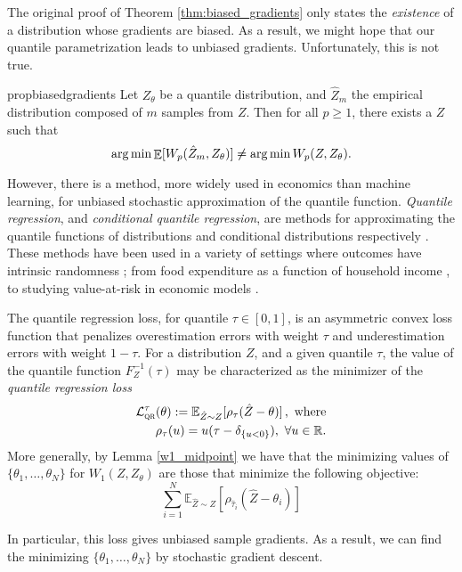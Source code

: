\documentclass[letterpaper]{article}
\newcommand{\cL}{\mathcal{L}}
\DeclareMathOperator*{\expect}{{\huge \mathbb{E}}}
\DeclareMathOperator*{\argmin}{arg\,min}
\begin{document}
The original proof of Theorem \ref{thm:biased_gradients} only states the \emph{existence} of a distribution whose gradients are biased. As a result, we might hope that our quantile parametrization leads to unbiased gradients. Unfortunately, this is not true.
\begin{restatable}{prop}{biasedgradients}\label{prop:biased_transpose_gradients}
Let $Z_\theta$ be a quantile distribution, and $\hat{Z}_m$ the empirical distribution composed of $m$ samples from $Z$. Then for all $p \ge 1$, there exists a $Z$ such that
\begin{equation*}
    \argmin \expect [ W_p(\hat{Z}_m, Z_\theta) ] \neq \argmin W_p(Z, Z_\theta) .
\end{equation*}
\end{restatable}

However, there is a method, more widely used in economics than machine learning, for unbiased stochastic approximation of the quantile function. \textit{Quantile regression}, and \textit{conditional quantile regression}, are methods for approximating the quantile functions of distributions and conditional distributions respectively \cite{qrbook}. These methods have been used in a variety of settings where outcomes have intrinsic randomness \cite{koenker2001quantile}; from food expenditure as a function of household income \cite{engel1857productions}, to studying value-at-risk in economic models \cite{taylor1999quantile}.

The quantile regression loss, for quantile $\tau \in [0,1]$, is an asymmetric convex loss function that penalizes overestimation errors with weight $\tau$ and underestimation errors with weight $1 - \tau$. For a distribution $Z$, and a given quantile $\tau$, the value of the quantile function $F_Z^{-1}(\tau)$ may be characterized as the minimizer of the \emph{quantile regression loss}
\begin{align}
    \nonumber \cL^\tau_{\textsc{qr}}(\theta) := \mathbb{E}_{\hat{Z} \sim Z}[\rho_\tau(\hat{Z} - \theta)] \, , \text{ where}\\
    \rho_\tau(u) = u(\tau - \delta_{\{u < 0\}}),\ \forall u \in \mathbb{R}.\label{eqn:qr_loss}
\end{align}
More generally, by Lemma \ref{w1_midpoint} we have that the minimizing values of $\{\theta_1, \ldots, \theta_N\}$ for $W_1(Z, Z_\theta)$ are those that minimize the following objective:
\[
\sum_{i=1}^N \mathbb{E}_{\hat{Z} \sim Z}[ \rho_{\hat{\tau}_i}(\hat{Z} - \theta_i) ]
\]

In particular, this loss gives unbiased sample gradients. As a result, we can find the minimizing $\{ \theta_1, \ldots, \theta_N \}$ by stochastic gradient descent. 
\end{document}
